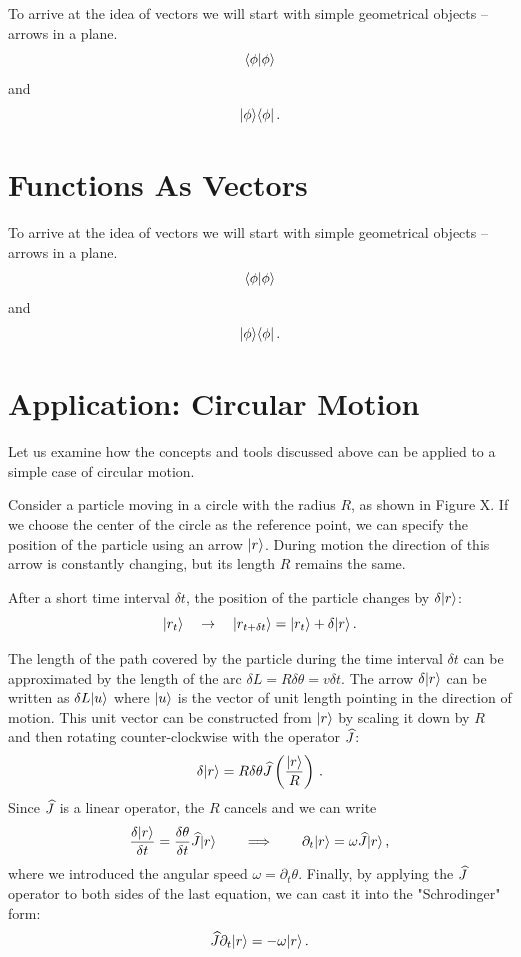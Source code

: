 To arrive at the idea of vectors we will start with simple geometrical
objects -- arrows in a plane.
\[
\langle{\phi}|{\phi\rangle}
\]
and
\[
|{\phi}\rangle\langle{\phi}|\,.
\]

\section{Functions As Vectors}

To arrive at the idea of vectors we will start with simple geometrical
objects -- arrows in a plane.
\[
\langle{\phi}|{\phi\rangle}
\]
and
\[
|{\phi}\rangle\langle{\phi}|\,.
\]

\section{Application: Circular Motion}
Let us examine how the concepts and tools discussed above can be applied to a simple case of circular motion.  

Consider a  particle moving in a circle with the radius $R$, as shown in Figure X. If we choose the center of the circle as the reference point, we can specify the position of the particle using an arrow $|{r}\rangle$. During motion the direction of this arrow is constantly changing, but its length $R$ remains the same.  

After a short time interval $\delta t$, the position of the particle changes by $\delta|{r}\rangle$:
\[
|{r_t}\rangle\quad\rightarrow\quad |{r_{t+\delta t}}\rangle = |{r_t}\rangle+\delta|{r}\rangle\,.
\]

The length of the path covered by the particle during the time interval $\delta t$ can be approximated by the length of the arc  $\delta L=R\delta\theta=v\delta t$. The arrow $\delta|{r}\rangle$ can be written as $\delta L|{u}\rangle$ where $|{u}\rangle$ is the vector of unit length pointing in the direction of motion. This unit vector can be constructed from $|{r}\rangle$ by scaling it down by $R$ and then rotating counter-clockwise with the operator $\widehat{J}$: 
\[
\delta|{r}\rangle=R\delta\theta\widehat{J}\left(\frac{|{r}\rangle}{R}\right)\,.
\]
Since $\widehat{J}$ is a linear operator, the $R$ cancels and we can write
\[
\frac{\delta|{r}\rangle}{\delta t}=\frac{\delta\theta}{\delta t}\widehat{J}|{r}\rangle\qquad\Longrightarrow\qquad
\partial_t|{r}\rangle=\omega\widehat{J}|{r}\rangle\,,
\]
where we introduced the angular speed $\omega=\partial_t\theta$. Finally, by applying the $\widehat{J}$ operator to both sides of the last equation, we can cast it into the "Schrodinger" form:
\[
\widehat{J}\partial_t|{r}\rangle=-\omega|{r}\rangle\,.
\]  



